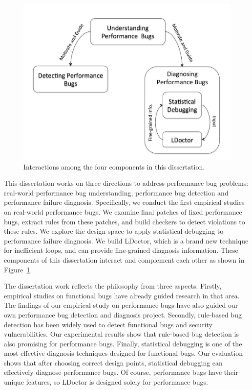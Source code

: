 \begin{figure}[t!]
\begin{center}
\includegraphics[width=4.5in]{figures/overview}
\caption{Interactions among the four components in this dissertation.}
\label{fig:overview}
\end{center}
\end{figure}

This dissertation works on three directions to address performance bug problems:
real-world performance bug understanding, 
performance bug detection and performance failure diagnosis. 
Specifically, we conduct the first empirical studies on real-world performance bugs. 
We examine final patches of fixed performance bugs, extract rules from these patches, 
and build checkers to detect violations to these rules. 
We explore the design space to apply statistical debugging to performance failure diagnosis. 
We build LDoctor, which is a brand new technique for inefficient loops, 
and can provide fine-grained diagnosis information.
These components of this dissertation interact and complement each other as shown in Figure~\ref{fig:overview}.

The dissertation work reflects the philosophy from three aspects. 
Firstly, empirical studies on functional bugs have already guided research in that area. 
The findings of our empirical study on performance bugs have also guided our own performance bug detection and diagnosis project. 
Secondly, rule-based bug detection has been widely used to detect functional bugs and security vulnerabilities. 
Our experimental results show that rule-based bug detection is also promising for performance bugs. 
Finally, statistical debugging is one of the most effective diagnosis techniques designed for functional bugs. 
Our evaluation shows that after choosing correct design points, statistical debugging can effectively diagnose performance bugs. 
Of course, performance bugs have their unique features, 
so LDoctor is designed solely for performance bugs. 

